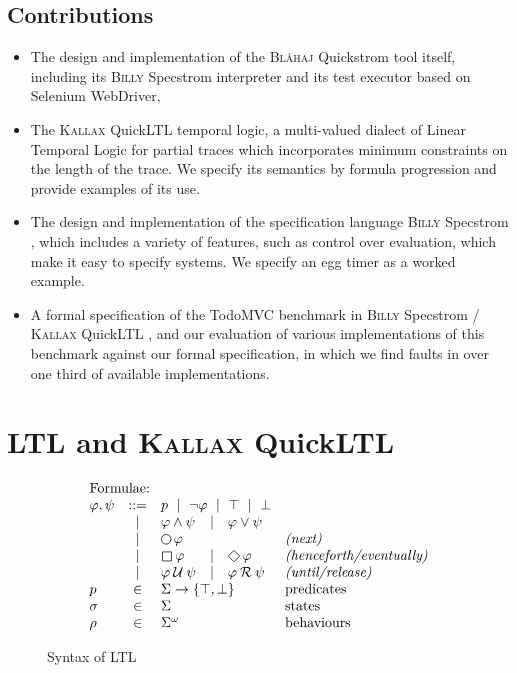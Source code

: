 \documentclass[sigplan,nonacm,10pt]{acmart}
\makeatletter
\newcommand{\Quickstrom}[0]{%
  \if@ACM@anonymous%
  \textsc{Bl\aa{}haj}%
  \else%
  Quickstrom%
  \fi\xspace}
\newcommand{\Specstrom}[0]{%
  \if@ACM@anonymous%
  \textsc{Billy}%
  \else%
  Specstrom%
  \fi\xspace}
\newcommand{\QuickLTL}[0]{%
    \if@ACM@anonymous%
    \textsc{Kallax}%
    \else%
    QuickLTL%
    \fi\xspace}
\newcommand{\Next}{\operatorname{%
  \tikz[baseline]{
    \draw[line width=.12ex]
      (0,.6ex) circle (.8ex);
  }}}{}
\newcommand{\Eventually}{\operatorname{%
  \tikz[baseline]{
    \draw[line width=.12ex,line join=round]
      (0ex,.6ex) -- (.95ex,1.55ex) -- (1.9ex,.6ex) -- (.95ex,-.35ex) -- cycle;
  }}}{}
\newcommand{\Always}{\operatorname{%
  \tikz[baseline]{
    \draw[draw=white] (-0.2ex,0ex) -- (1.7ex,0ex);
    \draw[line width=.12ex,line join=round]
      (0ex,-.2ex) -- (0ex,1.3ex) -- (1.5ex,1.3ex) -- (1.5ex,.-.2ex) -- cycle;
  }}}{}
\newcommand{\Until}{\mathbin{%
  \mathcal{U}}}{}
\newcommand{\Release}{\mathbin{%
  \mathcal{R}}}{}
\makeatother
\begin{document}
 \subsection*{Contributions}
 \begin{itemize}
\item The design and implementation of the \Quickstrom tool itself, including its \Specstrom interpreter and its test executor based on Selenium WebDriver,
\item The \QuickLTL temporal logic, a multi-valued dialect of Linear Temporal Logic for partial traces which incorporates minimum constraints on the
length of the trace. We specify its semantics by formula progression and provide examples of its use.
\item The design and implementation of the specification language \Specstrom, which includes a variety of features, such as control over evaluation, which make it easy to
specify systems. We specify an egg timer as a worked example.
\item A formal specification of the TodoMVC benchmark in \Specstrom/\QuickLTL, and our evaluation of various implementations of this benchmark against our formal specification, in which
we find faults in over one third of available implementations.
 \end{itemize}
 \section{LTL and \QuickLTL}\label{sec:quickltl}


 \begin{figure}
  \[
  \begin{array}{lclcll}
\multicolumn{3}{l}{\text{Formulae:}}\\
 \varphi, \psi & ::=  & \multicolumn{3}{l}{ p\ \mid\ \neg \varphi\ \mid\ \top\ \mid\ \bot} \\
    & \mid & \varphi \land \psi &\mid & \varphi \lor \psi \\
  & \mid & \Next{\varphi} & & & \textit{(next)} \\
            & \mid & \Always{\varphi} &\mid& \Eventually{\varphi}  & \textit{(henceforth/eventually)} \\
            & \mid & \varphi \Until \psi  & \mid & \varphi \Release \psi  & \textit{(until/release)} \\
  p  & \in & \multicolumn{3}{l}{\Sigma \rightarrow \{ \top, \bot \} } & \text{predicates}\\
\sigma & \in & \Sigma &&& \text{states}\\
\rho & \in & \Sigma^\omega &&& \text{behaviours}\\
  \end{array}
  \]
  \caption{Syntax of LTL}
  \label{fig:pnueli_ltl_syntax}
  \end{figure}
\end{document}
